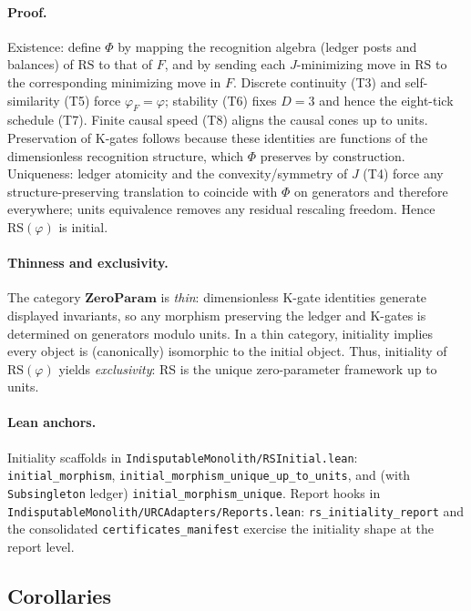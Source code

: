 \documentclass[11pt]{article}
\begin{document}
\paragraph{Proof.} Existence: define \(\Phi\) by mapping the recognition algebra (ledger posts and balances) of \(\mathrm{RS}\) to that of \(F\), and by sending each \(J\)\mbox{-}minimizing move in \(\mathrm{RS}\) to the corresponding minimizing move in \(F\). Discrete continuity (T3) and self\mbox{-}similarity (T5) force \(\varphi_F=\varphi\); stability (T6) fixes \(D=3\) and hence the eight\mbox{-}tick schedule (T7). Finite causal speed (T8) aligns the causal cones up to units. Preservation of K\mbox{-}gates follows because these identities are functions of the dimensionless recognition structure, which \(\Phi\) preserves by construction. Uniqueness: ledger atomicity and the convexity/symmetry of \(J\) (T4) force any structure\mbox{-}preserving translation to coincide with \(\Phi\) on generators and therefore everywhere; units equivalence removes any residual rescaling freedom. Hence \(\mathrm{RS}(\varphi)\) is initial.

\paragraph{Thinness and exclusivity.} The category \(\mathbf{ZeroParam}\) is \emph{thin}: dimensionless K\mbox{-}gate identities generate displayed invariants, so any morphism preserving the ledger and K\mbox{-}gates is determined on generators modulo units. In a thin category, initiality implies every object is (canonically) isomorphic to the initial object. Thus, initiality of \(\mathrm{RS}(\varphi)\) yields \emph{exclusivity}: RS is the unique zero\mbox{-}parameter framework up to units.

\paragraph{Lean anchors.} Initiality scaffolds in \texttt{IndisputableMonolith/RSInitial.lean}: \texttt{initial\_morphism}, \texttt{initial\_morphism\_unique\_up\_to\_units}, and (with \texttt{Subsingleton} ledger) \texttt{initial\_morphism\_unique}. Report hooks in \texttt{IndisputableMonolith/URCAdapters/Reports.lean}: \texttt{rs\_initiality\_report} and the consolidated \texttt{certificates\_manifest} exercise the initiality shape at the report level.

\subsection{Corollaries}
\end{document}
